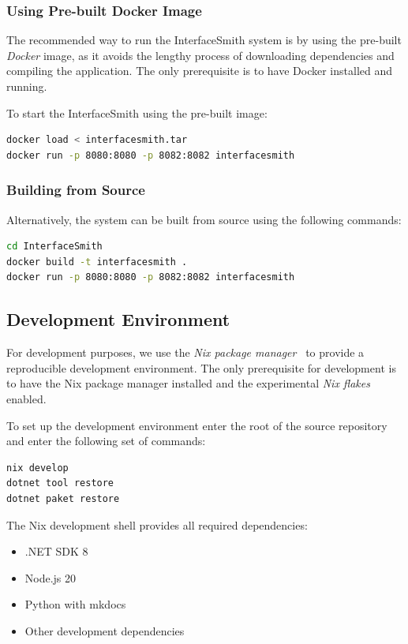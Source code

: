 \subsubsection{Using Pre-built Docker Image}

The recommended way to run the InterfaceSmith system is by using the pre-built \emph{Docker} image, as it avoids the lengthy process of downloading dependencies and compiling the application.
The only prerequisite is to have Docker installed and running.

To start the InterfaceSmith using the pre-built image:
\begin{lstlisting}[language=bash]
docker load < interfacesmith.tar
docker run -p 8080:8080 -p 8082:8082 interfacesmith
\end{lstlisting}

\subsubsection{Building from Source}

Alternatively, the system can be built from source using the following commands:
\begin{lstlisting}[language=bash]
cd InterfaceSmith
docker build -t interfacesmith .
docker run -p 8080:8080 -p 8082:8082 interfacesmith
\end{lstlisting}


\medskip
\subsection{Development Environment}

For development purposes, we use the \emph{Nix package manager}~\cite{Nix} to provide a reproducible development environment. The only prerequisite for development is to have the
Nix package manager installed and the experimental \emph{Nix flakes} enabled.

To set up the development environment enter the root of the source repository and enter the following set of commands:
\begin{lstlisting}[language=bash]
nix develop
dotnet tool restore
dotnet paket restore
\end{lstlisting}

\noindent The Nix development shell provides all required dependencies:
\begin{itemize}
	\item .NET SDK 8
	\item Node.js 20
	\item Python with mkdocs
	\item Other development dependencies
\end{itemize}

